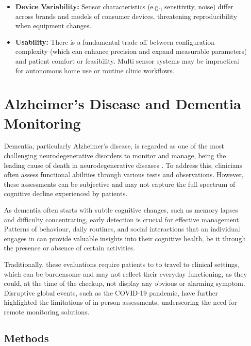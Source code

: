\documentclass[sigconf,nonacm]{acmart}
\begin{document}
\begin{itemize}
\begin{itemize}
            \item \textbf{Device Variability:} Sensor characteristics (e.g., sensitivity, noise) differ across brands and models of consumer devices, threatening reproducibility when equipment changes.
            
            \item \textbf{Usability:} There is a fundamental trade off between configuration complexity (which can enhance precision and expand measurable parameters) and patient comfort or feasibility. Multi sensor systems may be impractical for autonomous home use or routine clinic workflows.
        \end{itemize}
    \end{itemize}

\section{Alzheimer's Disease and Dementia Monitoring}

    Dementia, particularly Alzheimer's disease, is regarded as one of the most challenging neurodegenerative disorders to monitor and manage, being the leading cause of death in neurodegenerative diseases \cite{dementia}. To address this, clinicians often assess functional abilities through various tests and observations. However, these assessments can be subjective and may not capture the full spectrum of cognitive decline experienced by patients. 
    
    As dementia often starts with subtle cognitive changes, such as memory lapses and difficulty concentrating, early detection is crucial for effective management. Patterns of behaviour, daily routines, and social interactions that an individual engages in can provide valuable insights into their cognitive health, be it through the presence or absence of certain activities.
    
    Traditionally, these evaluations require patients to to travel to clinical settings, which can be burdensome and may not reflect their everyday functioning, as they could, at the time of the checkup, not display any obvious or alarming symptom. Disruptive global events, such as the COVID-19 pandemic, have further highlighted the limitations of in-person assessments, underscoring the need for remote monitoring solutions.

\subsection{Methods}
\end{document}
